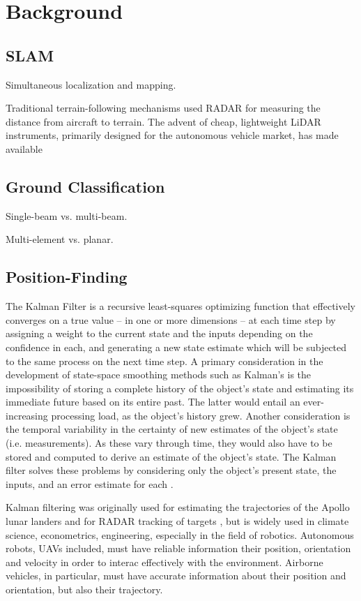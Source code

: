 \documentclass[10pt,a4paper]{report}
\begin{document}
\section{Background}

\subsection{SLAM}

Simultaneous localization and mapping.

Traditional terrain-following mechanisms used RADAR for measuring the distance from aircraft to terrain. The advent of cheap, lightweight LiDAR instruments, primarily designed for the autonomous vehicle market, has made available 

\subsection{Ground Classification}

Single-beam vs. multi-beam.

Multi-element vs. planar. \cite{Nobili2015}

\subsection{Position-Finding}

The Kalman Filter \cite{Kalman1960} is a recursive least-squares optimizing function that effectively converges on a true value -- in one or more dimensions -- at each time step by assigning a weight to the current state and the inputs depending on the confidence in each, and generating a new state estimate which will be subjected to the same process on the next time step. A primary consideration in the development of state-space smoothing methods such as Kalman's is the impossibility of storing a complete history of the object's state and estimating its immediate future based on its entire past. The latter would entail an ever-increasing processing load, as the object's history grew. Another consideration is the temporal variability in the certainty of new estimates of the object's state (i.e. measurements). As these vary through time, they would also have to be stored and computed to derive an estimate of the object's state. The Kalman filter solves these problems by considering only the object's present state, the inputs, and an error estimate for each \cite{Swerling1959}. 

Kalman filtering was originally used for estimating the trajectories of the Apollo lunar landers and for RADAR tracking of targets \cite{Grewal2010}, but is widely used in climate science, econometrics, engineering, especially in the field of robotics. Autonomous robots, UAVs included, must have reliable information their position, orientation and velocity in order to interac effectively with the environment. Airborne vehicles, in particular, must have accurate information about their position and orientation, but also their trajectory.
\end{document}
